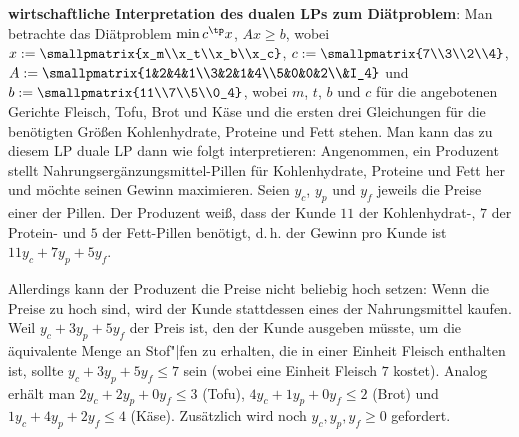 \textbf{wirtschaftliche Interpretation des dualen LPs zum Diätproblem}:
Man betrachte das Diätproblem $\min c^\tp x$, $Ax \ge b$,
wobei $x := \smallpmatrix{x_m\\x_t\\x_b\\x_c}$,
$c := \smallpmatrix{7\\3\\2\\4}$,
$A := \smallpmatrix{1&2&4&1\\3&2&1&4\\5&0&0&2\\&I_4}$ und
$b := \smallpmatrix{11\\7\\5\\0_4}$,
wobei $m$, $t$, $b$ und $c$ für die angebotenen Gerichte Fleisch, Tofu, Brot und Käse und
die ersten drei Gleichungen für die benötigten Größen Kohlenhydrate, Proteine und Fett stehen.
Man kann das zu diesem LP duale LP dann wie folgt interpretieren:
Angenommen, ein Produzent stellt Nahrungsergänzungsmittel-Pillen für Kohlenhydrate, Proteine
und Fett her und möchte seinen Gewinn maximieren.
Seien $y_c$, $y_p$ und $y_f$ jeweils die Preise einer der Pillen.
Der Produzent weiß, dass der Kunde $11$ der Kohlenhydrat-, $7$ der Protein- und $5$ der Fett-Pillen
benötigt, d.\,h. der Gewinn pro Kunde ist $11y_c + 7y_p + 5y_f$.

Allerdings kann der Produzent die Preise nicht beliebig hoch setzen:
Wenn die Preise zu hoch sind, wird der Kunde stattdessen eines der Nahrungsmittel kaufen.
Weil $y_c + 3y_p + 5y_f$ der Preis ist, den der Kunde ausgeben müsste, um die äquivalente Menge
an Stof"|fen zu erhalten, die in einer Einheit Fleisch enthalten ist, sollte
$y_c + 3y_p + 5y_f \le 7$ sein (wobei eine Einheit Fleisch $7$ kostet).
Analog erhält man $2y_c + 2y_p + 0y_f \le 3$ (Tofu),
$4y_c + 1y_p + 0y_f \le 2$ (Brot) und
$1y_c + 4y_p + 2y_f \le 4$ (Käse).
Zusätzlich wird noch $y_c, y_p, y_f \ge 0$ gefordert.


